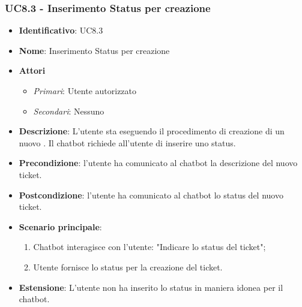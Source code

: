 \subsubsection{UC8.3 - Inserimento Status per creazione }
\begin{itemize}
	\item \textbf{Identificativo}: UC8.3
	\item \textbf{Nome}: Inserimento Status per creazione  
	\item \textbf{Attori}
	\begin{itemize} 
		\item \textit{Primari}: Utente autorizzato
		\item \textit{Secondari}: Nessuno
	\end{itemize}
	\item \textbf{Descrizione}: L'utente sta eseguendo il procedimento di creazione di un nuovo . Il chatbot richiede all'utente di inserire uno status.
	\item \textbf{Precondizione}: l'utente ha comunicato al chatbot la descrizione del nuovo ticket.
	\item \textbf{Postcondizione}: l'utente ha comunicato al chatbot lo status del nuovo ticket.
	\item \textbf{Scenario principale}: \begin{enumerate}
		\item Chatbot interagisce con l'utente: "Indicare lo status del ticket";
		\item Utente fornisce lo status per la creazione del ticket.
	\end{enumerate}
	\item \textbf{Estensione}: L'utente non ha inserito lo status in maniera idonea per il chatbot. 
\end{itemize}
